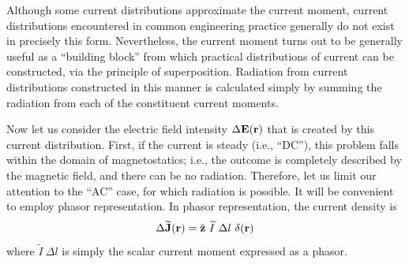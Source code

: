 Although some current distributions approximate the current moment, current distributions encountered in common engineering practice generally do not exist in precisely this form.
Nevertheless, the current moment turns out to be generally useful as a ``building block'' from which practical distributions of current can be constructed, via the principle of superposition.
Radiation from current distributions constructed in this manner is calculated simply by summing the radiation from each of the constituent current moments. 

Now let us consider the electric field intensity $\Delta{\bf E}({\bf r})$ that is created by this current distribution.
First, if the current is steady (i.e., ``DC''), this problem falls within the domain of magnetostatics; i.e., the outcome is completely described by the magnetic field, and there can be no radiation.
Therefore, let us limit our attention to the ``AC'' case, for which radiation is possible. 
It will be convenient to employ phasor representation. 
In phasor representation, the current density is
%
\begin{equation}
\Delta\widetilde{\bf J}({\bf r}) = \hat{\bf z}~\widetilde{I}~\Delta l~\delta({\bf r})
\label{m0194_eCM2}
\end{equation}
%
where $\widetilde{I}~\Delta l$ is simply the scalar current moment expressed as a phasor.

